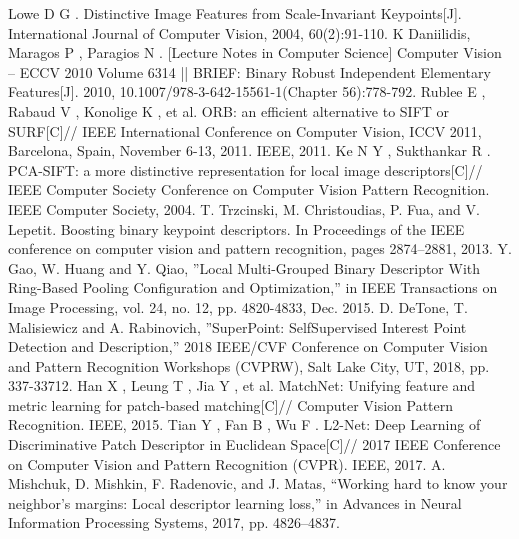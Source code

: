 \documentclass{svproc}
\begin{document}
\begin{thebibliography}{99}
 Lowe D G . Distinctive Image Features from Scale-Invariant Keypoints[J]. International Journal of Computer Vision, 2004, 60(2):91-110.
 K  Daniilidis,  Maragos P ,  Paragios N . [Lecture Notes in Computer Science] Computer Vision – ECCV 2010 Volume 6314 || BRIEF: Binary Robust Independent Elementary Features[J].  2010, 10.1007/978-3-642-15561-1(Chapter 56):778-792.
 Rublee E ,  Rabaud V ,  Konolige K , et al. ORB: an efficient alternative to SIFT or SURF[C]// IEEE International Conference on Computer Vision, ICCV 2011, Barcelona, Spain, November 6-13, 2011. IEEE, 2011.
 Ke N Y ,  Sukthankar R . PCA-SIFT: a more distinctive representation for local image descriptors[C]// IEEE Computer Society Conference on Computer Vision  Pattern Recognition. IEEE Computer Society, 2004.
 T. Trzcinski, M. Christoudias, P. Fua, and V. Lepetit. Boosting binary keypoint descriptors. In Proceedings of the IEEE conference on computer vision and pattern recognition, pages 2874–2881, 2013.
 Y. Gao, W. Huang and Y. Qiao, ”Local Multi-Grouped Binary Descriptor With Ring-Based Pooling Configuration and Optimization,” in IEEE Transactions on Image Processing, vol. 24, no. 12, pp. 4820-4833, Dec. 2015.
 D. DeTone, T. Malisiewicz and A. Rabinovich, ”SuperPoint: SelfSupervised Interest Point Detection and Description,” 2018 IEEE/CVF Conference on Computer Vision and Pattern Recognition Workshops (CVPRW), Salt Lake City, UT, 2018, pp. 337-33712.
 Han X ,  Leung T ,  Jia Y , et al. MatchNet: Unifying feature and metric learning for patch-based matching[C]// Computer Vision  Pattern Recognition. IEEE, 2015.
 Tian Y ,  Fan B ,  Wu F . L2-Net: Deep Learning of Discriminative Patch Descriptor in Euclidean Space[C]// 2017 IEEE Conference on Computer Vision and Pattern Recognition (CVPR). IEEE, 2017.
 A. Mishchuk, D. Mishkin, F. Radenovic, and J. Matas, “Working hard to know your neighbor’s margins: Local descriptor learning loss,” in Advances in Neural Information Processing Systems, 2017, pp. 4826–4837.


\end{thebibliography}
\end{document}
